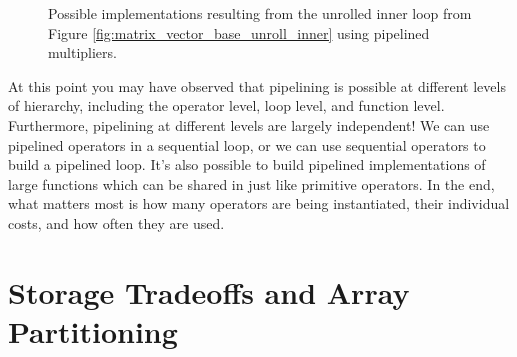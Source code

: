 \begin{figure}
\centering
\begin{tiny}

\end{tiny}
\caption{Possible implementations resulting from the unrolled inner loop from Figure \ref{fig:matrix_vector_base_unroll_inner} using pipelined multipliers.}\label{fig:dft_behavior_pipelined}
\end{figure}

At this point you may have observed that pipelining is possible at different levels of hierarchy, including the operator level, loop level, and function level.  Furthermore, pipelining at different levels are largely independent!  We can use pipelined operators in a sequential loop, or we can use sequential operators to build a pipelined loop.  It's also possible to build pipelined implementations of large functions which can be shared in \VHLS just like primitive operators.  In the end, what matters most is how many operators are being instantiated, their individual costs, and how often they are used.


%

\section{Storage Tradeoffs and Array Partitioning}
\label{subsec:dft_array_partitioning}

